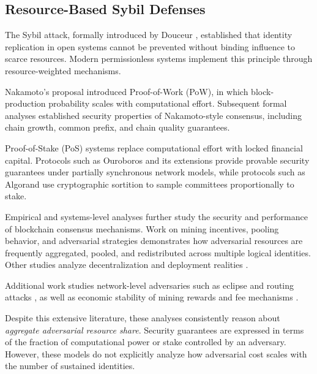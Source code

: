 \documentclass[journal]{IEEEtran}
\begin{document}
	\subsection{Resource-Based Sybil Defenses}
	
	The Sybil attack, formally introduced by Douceur \cite{douceur2002sybil},
	established that identity replication in open systems
	cannot be prevented without binding influence to scarce resources.
	Modern permissionless systems implement this principle
	through resource-weighted mechanisms.
	
	Nakamoto’s proposal \cite{nakamoto2008bitcoin}
	introduced Proof-of-Work (PoW), in which block-production
	probability scales with computational effort.
	Subsequent formal analyses
	\cite{garay2015backbone,ren2019nakamoto,pass2017hybrid,pass2017fruitchains}
	established security properties of Nakamoto-style consensus,
	including chain growth, common prefix, and chain quality guarantees.
	
	Proof-of-Stake (PoS) systems replace computational effort
	with locked financial capital.
	Protocols such as Ouroboros \cite{kiayias2017ouroboros}
	and its extensions
	\cite{kiayias2018ouroboros,kiayias2020genesis}
	provide provable security guarantees under partially synchronous
	network models, while protocols such as Algorand
	\cite{gilad2017algorand,gilad2017algorand_extended}
	use cryptographic sortition to sample committees
	proportionally to stake.
	
	Empirical and systems-level analyses further study the
	security and performance of blockchain consensus mechanisms.
	Work on mining incentives, pooling behavior, and adversarial strategies
	\cite{eyal2014majority,gervais2016security,rosenfeld2014analysis,tramer2020slush}
	demonstrates how adversarial resources are frequently aggregated,
	pooled, and redistributed across multiple logical identities.
	Other studies analyze decentralization and deployment realities
	\cite{bonneau2015sok,gencer2018decentralization,gervais2014isbitcoin,alwen2019blockchain}.
	
	Additional work studies network-level adversaries such as
	eclipse and routing attacks
	\cite{heilman2015eclipse,apostolaki2017hijacking,neudecker2019network},
	as well as economic stability of mining rewards and fee mechanisms
	\cite{carlsten2016instability,kroll2013economics,budish2018economic,budish2024economic}.
	
	Despite this extensive literature,
	these analyses consistently reason about
	\emph{aggregate adversarial resource share}.
	Security guarantees are expressed in terms of the
	fraction of computational power or stake controlled by
	an adversary.
	However, these models do not explicitly analyze how
	adversarial cost scales with the number of sustained identities.
	
\end{document}
